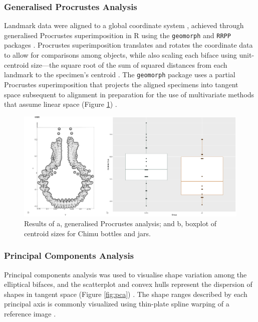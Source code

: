 \documentclass[]{interact}
\theoremstyle{plain}%
\theoremstyle{definition}
\theoremstyle{remark}
\begin{document}
\hypertarget{generalised-procrustes-analysis}{%
\subsubsection{Generalised Procrustes
Analysis}\label{generalised-procrustes-analysis}}

Landmark data were aligned to a global coordinate system
\citep{RN8477,RN7502,RN11622,RN11623,RN11563}, achieved through
generalised Procrustes superimposition \citep{RN11138,RN478,RN1646} in R
using the \texttt{geomorph} and \texttt{RRPP} packages
\citep{RN1655,RN11775,RN11530,RN1774,RN9565}. Procrustes superimposition
translates and rotates the coordinate data to allow for comparisons
among objects, while also scaling each biface using unit-centroid
size---the square root of the sum of squared distances from each
landmark to the specimen's centroid
\citep{RN11139,RN11140,RN11564,RN478}. The \texttt{geomorph} package
uses a partial Procrustes superimposition that projects the aligned
specimens into tangent space subsequent to alignment in preparation for
the use of multivariate methods that assume linear space (Figure
\ref{fig:gpa}) \citep{RN11141,RN11142,RN1646,RN11563}.

\begin{figure}\centering
\includegraphics[width=\linewidth]{figs/gpa.csize.png}
\caption{Results of a, generalised Procrustes analysis; and b, boxplot of centroid sizes for Chimu bottles and jars.}
\label{fig:gpa}
\end{figure}

\hypertarget{principal-components-analysis}{%
\subsubsection{Principal Components
Analysis}\label{principal-components-analysis}}

Principal components analysis \citep{RN1746} was used to visualise shape
variation among the elliptical bifaces, and the scatterplot and convex
hulls represent the dispersion of shapes in tangent space (Figure
\ref{fig:pca}) \citep{RN8633,RN5616,RN11143,RN7550}. The shape ranges
described by each principal axis is commonly visualized using thin-plate
spline warping of a reference image \citep{RN1731,RN479}.
\end{document}
